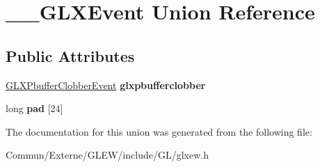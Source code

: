 \hypertarget{union_____g_l_x_event}{}\section{\+\_\+\+\_\+\+G\+L\+X\+Event Union Reference}
\label{union_____g_l_x_event}
\subsection*{Public Attributes}
\begin{DoxyCompactItemize}
\item 
\hyperlink{struct_g_l_x_pbuffer_clobber_event}{G\+L\+X\+Pbuffer\+Clobber\+Event} {\bfseries glxpbufferclobber}\hypertarget{union_____g_l_x_event_ada5880e2b424bcb2f60a411aaf713fae}{}\label{union_____g_l_x_event_ada5880e2b424bcb2f60a411aaf713fae}

\item 
long {\bfseries pad} \mbox{[}24\mbox{]}\hypertarget{union_____g_l_x_event_a1cb8f6e7e77a34d25baf43b3f3bc2d4f}{}\label{union_____g_l_x_event_a1cb8f6e7e77a34d25baf43b3f3bc2d4f}

\end{DoxyCompactItemize}


The documentation for this union was generated from the following file\+:\begin{DoxyCompactItemize}
\item 
Commun/\+Externe/\+G\+L\+E\+W/include/\+G\+L/glxew.\+h\end{DoxyCompactItemize}
